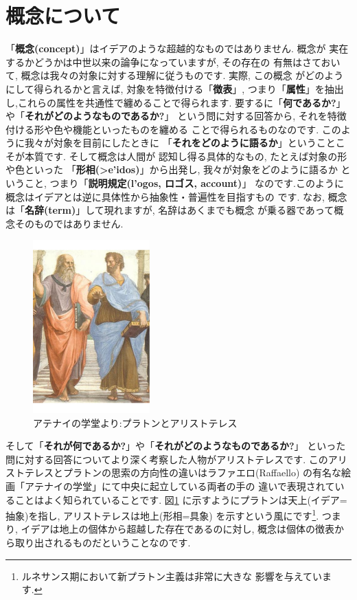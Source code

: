 \section{概念について}


「\textbf{概念(concept)}」はイデアのような超越的なものではありません. 概念が
実在するかどうかは中世以来の論争\cite{普遍論争}になっていますが, その存在の
有無はさておいて, 概念は我々の対象に対する理解に従うものです. 実際, この概念
がどのようにして得られるかと言えば, 対象を特徴付ける「\textbf{徴表}」,
 つまり「\textbf{属性}」を抽出し,これらの属性を共通性で纏めることで得られます.
 要するに「\textbf{何であるか?}」や「\textbf{それがどのようなものであるか?}」
という問に対する回答から, それを特徴付ける形や色や機能といったものを纏める
ことで得られるものなのです. このように我々が対象を目前にしたときに
「\textbf{それをどのように語るか}」ということこそが本質です. そして概念は人間が
認知し得る具体的なもの, たとえば対象の形や色といった
「\textbf{形相(\textgreek{>e'idos})}」から出発し, 我々が対象をどのように語るか
ということ, つまり「\textbf{説明規定(\textgreek{l'ogos}, ロゴス, account)}」
なのです.このように概念はイデアとは逆に具体性から抽象性・普遍性を目指すもの
です. なお, 概念は「\textbf{名辞(term)}」して現れますが, 名辞はあくまでも概念
が乗る器であって概念そのものではありません.
\newline

\begin{figure}
\includegraphics[width=4.5cm]{Plato_and_Aristotle_in_The_School_of_Athens,_by_italian_Rafael.pdf}
\caption{アテナイの学堂より:プラトンとアリストテレス}
\label{fig:Plato-Aristotle}
\end{figure}


そして「\textbf{それが何であるか?}」や「\textbf{それがどのようなものであるか?}」
といった問に対する回答についてより深く考察した人物がアリストテレスです.
 このアリストテレスとプラトンの思索の方向性の違いはラファエロ(Raffaello)
の有名な絵画「アテナイの学堂」\cite{アテナイ}にて中央に起立している両者の手の
違いで表現されていることはよく知られていることです. 図\ref{fig:Plato-Aristotle}
に示すようにプラトンは天上(イデア=抽象)を指し, アリストテレスは地上(形相=具象)
を示すという風にです\footnote{ルネサンス期において新プラトン主義は非常に大きな
影響を与えています.}. つまり, イデアは地上の個体から超越した存在であるのに対し,
 概念は個体の徴表から取り出されるものだということなのです.
\newline

